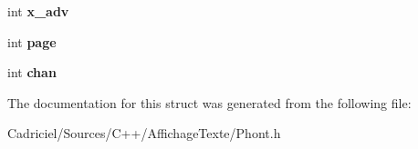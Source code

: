 \begin{DoxyCompactItemize}
\item 
\hypertarget{struct_phont_1_1phont__bfg__char_aa8928a577e58d3a54d76e18509ed6ff6}{int {\bfseries x\-\_\-adv}}\label{struct_phont_1_1phont__bfg__char_aa8928a577e58d3a54d76e18509ed6ff6}

\item 
\hypertarget{struct_phont_1_1phont__bfg__char_aecdae054fb13a8f150a866c2b3edf6a6}{int {\bfseries page}}\label{struct_phont_1_1phont__bfg__char_aecdae054fb13a8f150a866c2b3edf6a6}

\item 
\hypertarget{struct_phont_1_1phont__bfg__char_a0ba88b4061974388794a4aa858bfda5c}{int {\bfseries chan}}\label{struct_phont_1_1phont__bfg__char_a0ba88b4061974388794a4aa858bfda5c}

\end{DoxyCompactItemize}


The documentation for this struct was generated from the following file\-:\begin{DoxyCompactItemize}
\item 
Cadriciel/\-Sources/\-C++/\-Affichage\-Texte/Phont.\-h\end{DoxyCompactItemize}
